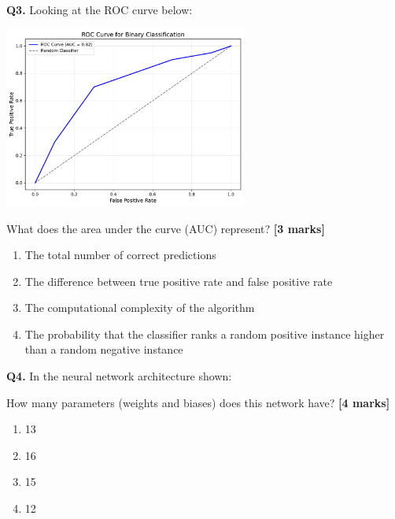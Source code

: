 \documentclass{article}
\begin{document}
\vspace{0.3cm}

\textbf{Q3.} Looking at the ROC curve below:

\begin{center}
\includegraphics[width=0.6\textwidth]{figures/roc_curve.pdf}
\end{center}

What does the area under the curve (AUC) represent? \textbf{[3 marks]}

\begin{enumerate}[label=(\Alph*)]

  \item The total number of correct predictions

  \item The difference between true positive rate and false positive rate

  \item The computational complexity of the algorithm

  \item The probability that the classifier ranks a random positive instance higher than a random negative instance

\end{enumerate}

\vspace{0.3cm}

\textbf{Q4.} In the neural network architecture shown:

\begin{center}

\end{center}

How many parameters (weights and biases) does this network have? \textbf{[4 marks]}

\begin{enumerate}[label=(\Alph*)]

  \item 13

  \item 16

  \item 15

  \item 12

\end{enumerate}
\end{document}
